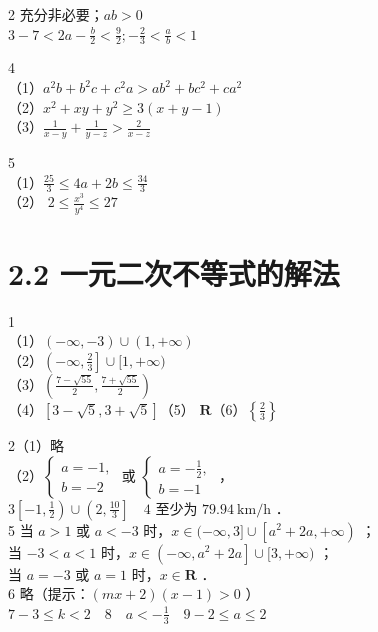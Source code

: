 \documentclass[10pt]{article}
\begin{document}
2 充分非必要；\(a b>0\)\\
\(3-7<2 a-\frac{b}{2}<\frac{9}{2} ;-\frac{2}{3}<\frac{a}{b}<1\)

4\\
（1）\(a^{2} b+b^{2} c+c^{2} a>a b^{2}+b c^{2}+c a^{2}\)\\
（2）\(x^{2}+x y+y^{2} \geqslant 3(x+y-1)\)\\
（3）\(\frac{1}{x-y}+\frac{1}{y-z}>\frac{2}{x-z}\)

5\\
（1）\(\frac{25}{3} \leqslant 4 a+2 b \leqslant \frac{34}{3}\)\\
（2） \(2 \leqslant \frac{x^{3}}{y^{4}} \leqslant 27\)

\section*{2.2 一元二次不等式的解法}
1\\
（1）\((-\infty,-3) \cup(1,+\infty)\)\\
（2）\(\left(-\infty, \frac{2}{3}\right] \cup[1,+\infty)\)\\
（3）\(\left(\frac{7-\sqrt{55}}{2}, \frac{7+\sqrt{55}}{2}\right)\)\\
（4）\([3-\sqrt{5}, 3+\sqrt{5}]\)（5） \(\mathbf{R}\)（6）\(\left\{\frac{2}{3}\right\}\)

2（1）略\\
（2）\(\left\{\begin{array}{l}a=-1, \\ b=-2\end{array}\right.\) 或 \(\left\{\begin{array}{l}a=-\frac{1}{2}, \\ b=-1\end{array}\right.\) ，\\
\(3\left[-1, \frac{1}{2}\right) \cup\left(2, \frac{10}{3}\right] \quad 4\) 至少为 \(79.94 \mathrm{~km} / \mathrm{h}\) ．\\
5 当 \(a>1\) 或 \(a<-3\) 时，\(x \in(-\infty, 3] \cup\left[a^{2}+2 a,+\infty\right)\) ；\\
当 \(-3<a<1\) 时，\(x \in\left(-\infty, a^{2}+2 a\right] \cup[3,+\infty)\) ；\\
当 \(a=-3\) 或 \(a=1\) 时，\(x \in \mathbf{R}\) ．\\
6 略（提示：\((m x+2)(x-1)>0\) ）\\
\(7-3 \leqslant k<2 \quad 8 \quad a<-\frac{1}{3} \quad 9-2 \leqslant a \leqslant 2\)
\end{document}
